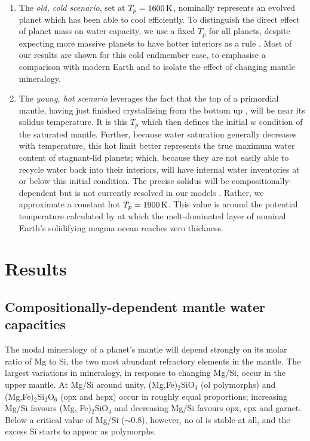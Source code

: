 \documentclass[fleqn,usenatbib]{mnras}
\begin{document}
\begin{enumerate} 
\item The \textit{old, cold scenario}, set at $T_p = 1600\,{\rm K}$, nominally represents an evolved planet which has been able to cool efficiently. To distinguish the direct effect of planet mass on water capacity, we use a fixed $T_p$ for all planets, despite expecting more massive planets to have hotter interiors as a rule \citep[e.g.,][]{valencia_internal_2006}. Most of our results are shown for this cold endmember case, to emphasise a comparison with modern Earth and to isolate the effect of changing mantle mineralogy.

\item The \textit{young, hot scenario} leverages the fact that the top of a primordial mantle, having just finished crystallising from the bottom up \citep{elkins-tanton_linked_2008}, will be near its solidus temperature. It is this $T_p$ which then defines the initial $w$ condition of the saturated mantle. Further, because water saturation generally decreases with temperature, this hot limit better represents the true maximum water content of stagnant-lid planets; which, because they are not easily able to recycle water back into their interiors, will have internal water inventories at or below this initial condition. The precise solidus will be compositionally-dependent but is not currently resolved in our models \citep[see also section \ref{sec:discussion-temperature}]{hirschmann_mantle_2000}. Rather, we approximate a constant hot $T_p = 1900\,{\rm K}$. This value is around the potential temperature calculated by \citet{miyazaki_wet_2022} at which the melt-dominated layer of nominal Earth's solidifying magma ocean reaches zero thickness. 

\end{enumerate}




\section{Results}\label{sec:results}

\subsection{Compositionally-dependent mantle water capacities}

The modal mineralogy of a planet's mantle will depend strongly on its molar ratio of Mg to Si, the two most abundant refractory elements in the mantle. The largest variations in mineralogy, in response to changing Mg/Si, occur in the upper mantle. At Mg/Si around unity, (Mg,Fe)$_2$SiO$_4$ (ol polymorphs) and (Mg,Fe)$_2$Si$_2$O$_6$ (opx and hcpx) occur in roughly equal proportions; increasing Mg/Si favours (Mg, Fe)$_2$SiO$_4$ and decreasing Mg/Si favours opx, cpx and garnet. Below a critical value of Mg/Si ($\sim$0.8), however, no ol is stable at all, and the excess Si starts to appear as  polymorphs.
\end{document}
